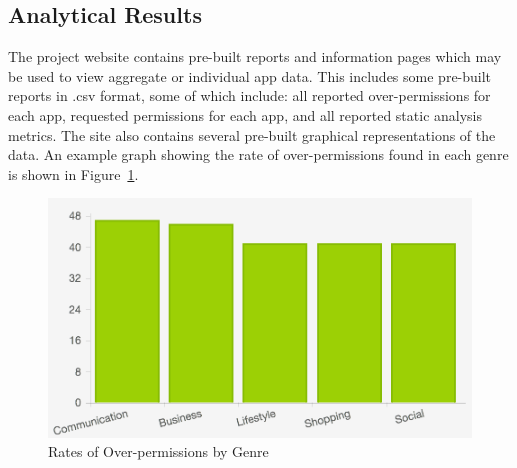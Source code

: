 \documentclass{sig-alternate-05-2015}
\newcommand{\todo}[1]{\textcolor{cyan}{\textbf{[#1]}}}
\begin{document}


%















\subsection{Analytical Results}

The project website contains pre-built reports and information pages which may be used to view aggregate or individual app data. This includes some pre-built reports in .csv format, some of which include: all reported over-permissions for each app, requested permissions for each app, and all reported static analysis metrics. The site also contains several pre-built graphical representations of the data. An example graph showing the rate of over-permissions found in each genre is shown in Figure~\ref{fig:overPrivsGenre}.

 \begin{figure}[h]
\centering
\includegraphics[width=\columnwidth, angle = 0]{images/OverPrivsGenre.png}
\caption{Rates of Over-permissions by Genre}
\label{fig:overPrivsGenre}
\end{figure}
\end{document}
